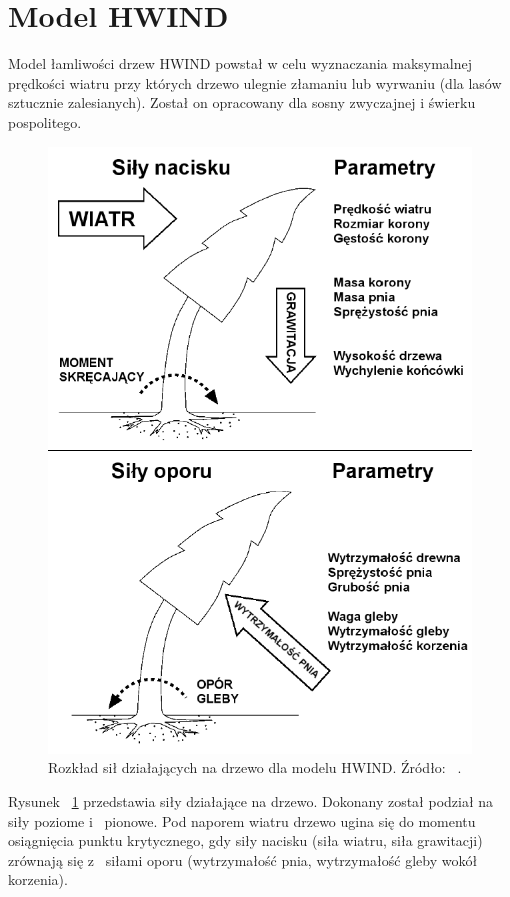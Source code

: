 \section{Model HWIND}

Model łamliwości drzew HWIND powstał w celu wyznaczania maksymalnej prędkości wiatru przy których drzewo ulegnie złamaniu lub wyrwaniu (dla lasów sztucznie zalesianych). Został on opracowany dla sosny zwyczajnej i świerku pospolitego.

\begin{figure}[!h]
	\center
	\includegraphics[scale=0.45]{HWIND1}
	\caption{Rozkład sił działających na drzewo dla modelu HWIND. Źródło: ~\cite{chm_mgza}.}
	\label{fig:HWIND1}
\end{figure} 

Rysunek ~\ref{fig:HWIND1} przedstawia siły działające na drzewo. Dokonany został podział na siły poziome i ~pionowe.
Pod naporem wiatru drzewo ugina się do momentu osiągnięcia punktu krytycznego, gdy siły nacisku (siła wiatru, siła grawitacji) zrównają się z ~siłami oporu (wytrzymałość pnia, wytrzymałość gleby wokół korzenia).


